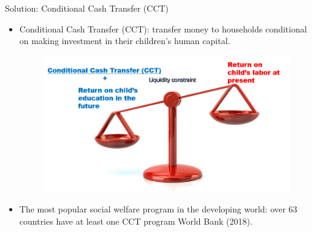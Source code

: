 \documentclass{beamer}
\begin{document}
\begin{frame}{Solution: Conditional Cash Transfer (CCT)}
\begin{itemize}
    \item Conditional Cash Transfer (CCT): transfer money to households conditional on making investment in their children’s human capital.
    \begin{figure}
        \centering
        \includegraphics[scale=0.3]{images/balance2.png}
        \label{fig:balance2}
    \end{figure}
    \item The most popular social welfare program in the developing world: over 63 countries have at least one CCT program \textcolor{mygray}{World Bank (2018)}.
\end{itemize}
\end{frame}



\end{document}
